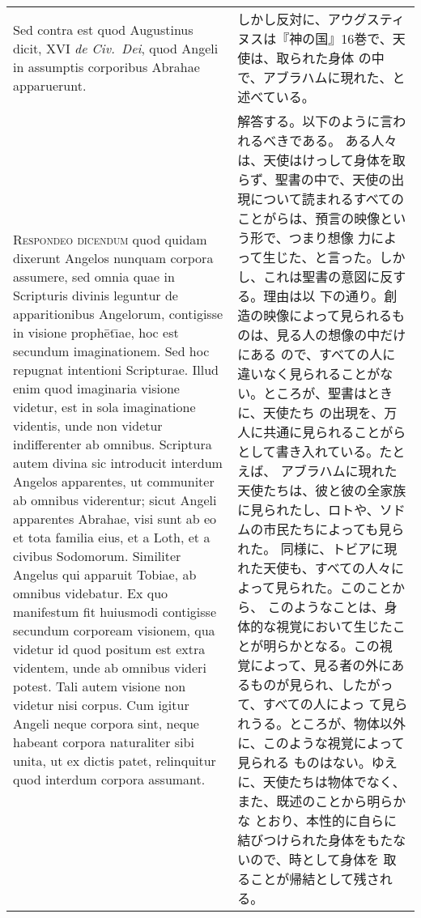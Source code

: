 \documentclass[10pt]{jsarticle} %
\begin{document}
\begin{longtable}{p{21em}p{21em}}
\\


Sed contra est quod Augustinus dicit, XVI {\itshape de
Civ.~Dei}, quod Angeli in assumptis corporibus Abrahae apparuerunt.

&
しかし反対に、アウグスティヌスは『神の国』16巻で、天使は、取られた身体
 の中で、アブラハムに現れた、と述べている。

\\


{\scshape Respondeo dicendum} quod quidam dixerunt
Angelos nunquam corpora assumere, sed omnia quae in Scripturis divinis
leguntur de apparitionibus Angelorum, contigisse in visione proph\={e}t\={\i}ae,
hoc est secundum imaginationem. Sed hoc repugnat intentioni
Scripturae. Illud enim quod imaginaria visione videtur, est in sola
imaginatione videntis, unde non videtur indifferenter ab
omnibus. Scriptura autem divina sic introducit interdum Angelos
apparentes, ut communiter ab omnibus viderentur; sicut Angeli apparentes
Abrahae, visi sunt ab eo et tota familia eius, et a Loth, et a civibus
Sodomorum. Similiter Angelus qui apparuit Tobiae, ab omnibus
videbatur. Ex quo manifestum fit huiusmodi contigisse secundum corpoream
visionem, qua videtur id quod positum est extra videntem, unde ab
omnibus videri potest. Tali autem visione non videtur nisi corpus. Cum
igitur Angeli neque corpora sint, neque habeant corpora naturaliter sibi
unita, ut ex dictis patet, relinquitur quod interdum corpora assumant.

&
解答する。以下のように言われるべきである。
ある人々は、天使はけっして身体を取らず、聖書の中で、天使の出
 現について読まれるすべてのことがらは、預言の映像という形で、つまり想像
 力によって生じた、と言った。しかし、これは聖書の意図に反する。理由は以
 下の通り。創造の映像によって見られるものは、見る人の想像の中だけにある
 ので、すべての人に違いなく見られることがない。ところが、聖書はときに、天使たち
 の出現を、万人に共通に見られることがらとして書き入れている。たとえば、
 アブラハムに現れた天使たちは、彼と彼の全家族に見られたし、ロトや、ソド
 ムの市民たちによっても見られた。
同様に、トビアに現れた天使も、すべての人々によって見られた。このことから、
 このようなことは、身体的な視覚において生じたことが明らかとなる。この視
 覚によって、見る者の外にあるものが見られ、したがって、すべての人によっ
 て見られうる。ところが、物体以外に、このような視覚によって見られる
ものはない。ゆえに、天使たちは物体でなく、また、既述のことから明らかな
 とおり、本性的に自らに結びつけられた身体をもたないので、時として身体を
 取ることが帰結として残される。


\end{longtable}
\end{document}
